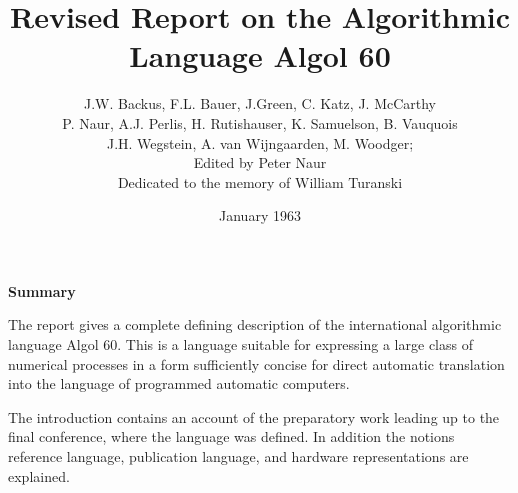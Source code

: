 \documentclass[a4paper,11pt]{article}
\begin{document}
\setcounter{secnumdepth}{5}

\title{Revised Report on the Algorithmic Language Algol 60}

\author{J.W. Backus, F.L. Bauer, J.Green, C. Katz, J. McCarthy\\
   P. Naur, A.J. Perlis, H. Rutishauser, K. Samuelson, B. Vauquois\\
   J.H. Wegstein, A. van Wijngaarden, M. Woodger; \\
   Edited by Peter Naur\\
   Dedicated to the memory of William Turanski}


\date{January 1963}

\maketitle

\def\keyw#1{{\tt \bf \underline{#1}}}
\def\blankchar{\leavevmode\hbox{\tt\char`\ }}

\def\mleqv{$\equiv$}
\def\mlnot{$\neg$}
\def\mland{$\wedge$}
\def\mlor{$\vee$}
\def\mlimp{$\Rightarrow$}
\def\mlt{$<$}
\def\mle{$\leq$}
\def\mgt{$>$}
\def\mge{$\geq$}
\def\meq{$=$}
\def\mne{$\neq$}
\def\mpow{$\uparrow$}
\def\mtim{$\times$}
\def\mdiv{$\div$}
\def\ten{$_{10}$}

\def\mychapter#1{{\Huge \bf \vspace{1em}#1}\vspace{1.0em}}
\def\mysection#1{{\Large \bf \vspace{1em}#1}\vspace{1.0em}}
\def\mysubsection#1{{\large \bf \vspace{1em}#1}\vspace{1.0em}}



\mychapter{Summary}

The report gives a complete defining description of the international
algorithmic language Algol 60. This is a language suitable for
expressing a large class of numerical processes in a form sufficiently
concise for direct automatic translation into the language of
programmed automatic computers.

The introduction contains an account of the preparatory work leading
up to the final conference, where the language was defined. In
addition the notions reference language, publication language, and
hardware representations are explained.
\end{document}
